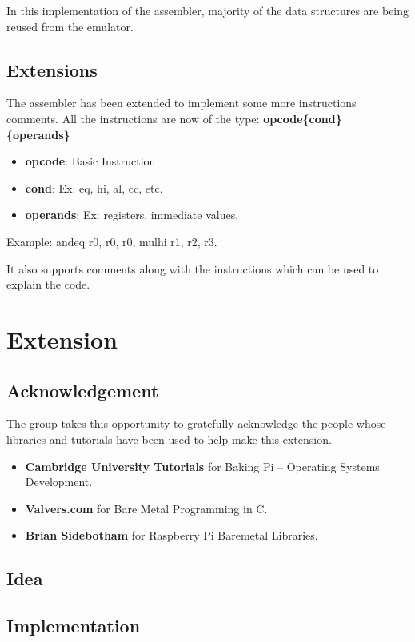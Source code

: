 \documentclass[11pt]{article}
\begin{document}
In this implementation of the assembler, majority of the data structures are
being reused from the emulator. 

\subsection{Extensions}
The assembler has been extended to implement some more instructions comments. 
All the instructions are now of the type:
\textbf{opcode\{cond\} \{operands\}}
\begin{itemize}[noitemsep,topsep=0pt]
	\item \textbf{opcode}: Basic Instruction
	\item \textbf{cond}: Ex: eq, hi, al, cc, etc.
	\item \textbf{operands}: Ex: registers, immediate values.
\end{itemize}
Example: andeq r0, r0, r0, mulhi r1, r2, r3.

It also supports comments along with the instructions which can be used to
explain the code.

\section{Extension}
\subsection{Acknowledgement}
The group takes this opportunity to gratefully acknowledge the people whose 
libraries and tutorials have been used to help make this extension.

\begin{itemize}[noitemsep,topsep=0pt]
	\item \textbf{Cambridge University Tutorials} for Baking Pi – 
	Operating Systems Development.
	\item \textbf{Valvers.com} for Bare Metal Programming in C.
	\item \textbf{Brian Sidebotham} for Raspberry Pi Baremetal Libraries.
\end{itemize}


\subsection{Idea}

\subsection{Implementation}
\end{document}
